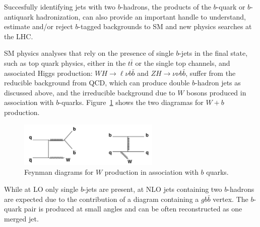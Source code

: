 Succesfully identifying jets with two $b$-hadrons, the products of the $b$-quark or $b$-antiquark hadronization, 
can also provide an important handle to understand, estimate and/or reject $b$-tagged backgrounds to SM and new physics searches at the LHC.

SM physics analyses that rely on the presence of single $b$-jets in the final state, such as top quark physics, either in the $t\bar{t}$ or the single top channels, and associated Higgs production: $WH\rightarrow\ell\nu b\bar{b}$ and $ZH\rightarrow\nu\nu b\bar{b}$,  suffer from  %
the reducible background from QCD, which can produce double $b$-hadron jets as discussed above, and the irreducible background due to $W$ bosons produced in association with $b$-quarks.
Figure~\ref{fig:Wplusb} shows the two diagramas %
for $W+b$ production. %

\begin{figure}[htbp]
  \begin{center}
      \includegraphics[width=0.6\textwidth]{FIGS/Wbb_diagram.jpg}
    \caption{Feynman diagrams for $W$ production in association with $b$ quarks.}
    \label{fig:Wplusb}
  \end{center}
\end{figure}

While at LO only single $b$-jets are present, at NLO jets containing two $b$-hadrons are expected due to the contribution of a diagram containing a $gb\bar{b}$ vertex. The $b$-quark pair is produced at small angles and can be often reconstructed as one merged jet.




